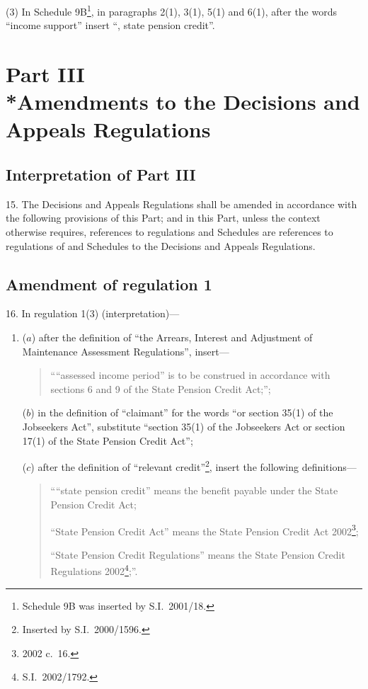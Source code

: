 \documentclass[12pt,a4paper]{article}
\begin{document}
(3) In Schedule 9B\footnote{Schedule 9B was inserted by S.I.\ 2001/18.}, in paragraphs 2(1), 3(1), 5(1) and 6(1), after the words “income support” insert “, state pension credit”.

\section[Part III --- Amendments to the Decisions and Appeals Regulations]{Part III\\*Amendments to the Decisions and Appeals Regulations}

\subsection[15. Interpretation of Part III]{Interpretation of Part III}

\renewcommand\parthead{--- Part III}

15.  The Decisions and Appeals Regulations shall be amended in accordance with the following provisions of this Part; and in this Part, unless the context otherwise requires, references to regulations and Schedules are references to regulations of and Schedules to the Decisions and Appeals Regulations.

\subsection[16. Amendment of regulation 1]{Amendment of regulation 1}

16.  In regulation 1(3) (interpretation)—
\begin{enumerate}\item[]
($a$) after the definition of “the Arrears, Interest and Adjustment of Maintenance Assessment Regulations”, insert—
\begin{quotation}
    ““assessed income period” is to be construed in accordance with sections 6 and 9 of the State Pension Credit Act;”; 
\end{quotation}

($b$) in the definition of “claimant” for the words “or section 35(1) of the Jobseekers Act”, substitute “section 35(1) of the Jobseekers Act or section 17(1) of the State Pension Credit Act”;

($c$) after the definition of “relevant credit”\footnote{Inserted by S.I.\ 2000/1596.}, insert the following definitions—
\begin{quotation}
““state pension credit” means the benefit payable under the State Pension Credit Act;

“State Pension Credit Act” means the State Pension Credit Act 2002\footnote{2002 c.\ 16.};

“State Pension Credit Regulations” means the State Pension Credit Regulations 2002\footnote{S.I.\ 2002/1792.};”.
\end{quotation}
\end{enumerate}
\end{document}
